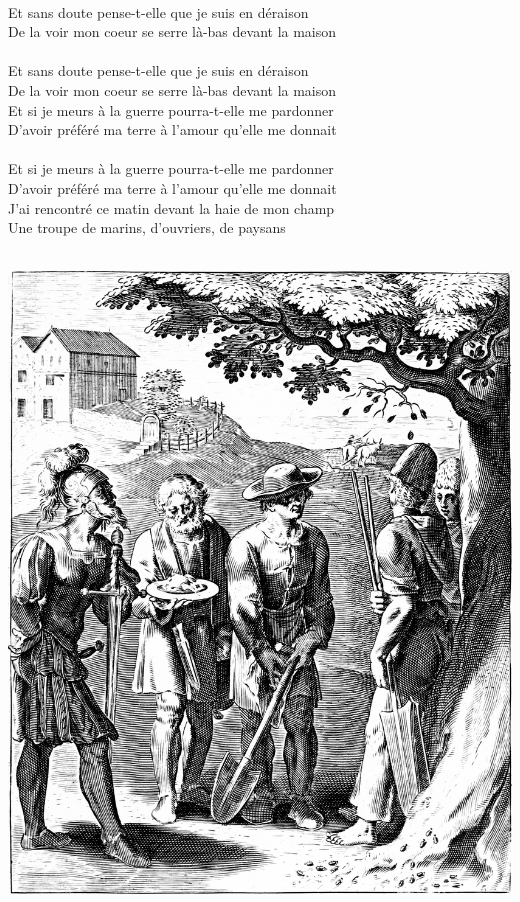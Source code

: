 \\Et sans doute pense-t-elle que je suis en déraison
\\De la voir mon coeur se serre là-bas devant la maison
\\\\Et sans doute pense-t-elle que je suis en déraison
\\De la voir mon coeur se serre là-bas devant la maison
\\Et si je meurs à la guerre pourra-t-elle me pardonner
\\D'avoir préféré ma terre à l'amour qu'elle me donnait
\\\\Et si je meurs à la guerre pourra-t-elle me pardonner
\\D'avoir préféré ma terre à l'amour qu'elle me donnait
\\J'ai rencontré ce matin devant la haie de mon champ
\\Une troupe de marins, d'ouvriers, de paysans
\\\\
\bigskip
\begin{center}
   \includegraphics[width=1\textwidth]{images/brev22.png}
 \end{center}

\breakpage